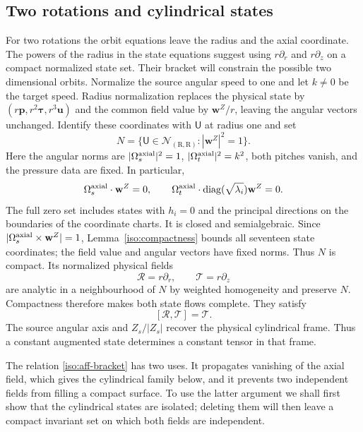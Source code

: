 \documentclass[11pt,a4paper]{article}
\numberwithin{equation}{section}
\theoremstyle{plain}
\theoremstyle{definition}
\theoremstyle{remark}
\begin{document}
\subsection{Two rotations and cylindrical states}\label{iso:two-rotations}

For two rotations the orbit equations leave the radius and the axial
coordinate. The powers of the radius in the state equations suggest
using $r\partial_r$ and $r\partial_z$ on a compact normalized state
set. Their bracket will constrain the possible two dimensional
orbits. Normalize the source angular speed to one and let $k\ne0$ be
the target speed. Radius normalization replaces the physical state by
$(r\boldsymbol p,r^2\boldsymbol\tau,r^3\boldsymbol u)$ and the common field
value by $\mathbf w^Z/r$, leaving the angular vectors unchanged.
Identify these coordinates with $\mathsf U$ at radius one and set
\[
 N=\{\mathsf U\in\mathscr N_{(\mathrm{R},\mathrm{R})}:
                         |\mathbf w^Z|^2=1\}.
\]
Here the angular norms are $|\Omega_s^{\rm axial}|^2=1$, $|\Omega_t^{\rm axial}|^2=k^2$,
both pitches vanish, and the pressure data are fixed. In particular,
\[
 \Omega_s^{\rm axial}\cdot\mathbf w^Z=0,\qquad
 \Omega_t^{\rm axial}\cdot\operatorname{diag}(\sqrt{\lambda_i})\mathbf w^Z=0.
\]
The full zero set includes states with $h_i=0$ and the principal directions
on the boundaries of the coordinate charts. It is closed and
semialgebraic. Since $|\Omega_s^{\rm axial}\times\mathbf w^Z|=1$,
Lemma~\ref{iso:compactness} bounds all seventeen state coordinates;
the field value and angular vectors have fixed norms. Thus $N$ is compact.
Its normalized physical fields
\[
 \mathcal R=r\partial_r,\qquad \mathcal T=r\partial_z
\]
are analytic in a neighbourhood of $N$ by weighted homogeneity and
preserve $N$. Compactness therefore makes both state flows complete.
They satisfy
\begin{equation}\label{iso:aff-bracket}
 [\mathcal R,\mathcal T]=\mathcal T.
\end{equation}
The source angular axis and $Z_s/|Z_s|$ recover the physical
cylindrical frame. Thus a constant augmented state determines a
constant tensor in that frame.

The relation \eqref{iso:aff-bracket} has two uses.  It propagates
vanishing of the axial field, which gives the cylindrical family below,
and it prevents two independent fields from filling a compact surface.
To use the latter argument we shall first show that the cylindrical
states are isolated; deleting them will then leave a compact invariant
set on which both fields are independent.
\end{document}
